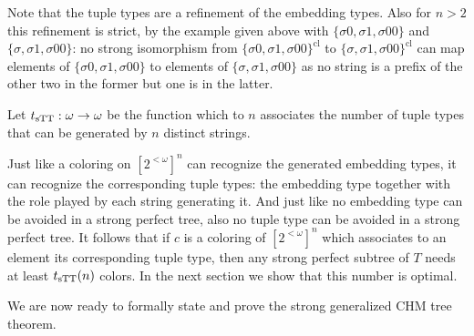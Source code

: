 Note that the tuple types are a refinement of the embedding types. Also for $n>2$ this refinement is strict, by the example given above with $\{\sigma0,\sigma1,\sigma00\}$ and $\{\sigma,\sigma1,\sigma00\}$: no strong isomorphism from $\{\sigma0,\sigma1,\sigma00\}^{\mathrm{cl}}$ to $\{\sigma,\sigma1,\sigma00\}^{\mathrm{cl}}$ can map elements of $\{\sigma0,\sigma1,\sigma00\}$ to elements of $\{\sigma,\sigma1,\sigma00\}$ as no string is a prefix of the other two in the former but one is in the latter.

\begin{definition}
Let $t_{\mathrm{sTT}}:\omega \rightarrow \omega$ be the function which to $n$ associates the number of tuple types that can be generated by $n$ distinct strings. 
\end{definition}

Just like a coloring on $[2^{<\omega}]^n$ can recognize the generated embedding types, it can recognize the corresponding tuple types: the embedding type together with the role played by each string generating it. And just like no embedding type can be avoided in a strong perfect tree, also no tuple type can be avoided in a strong perfect tree. It follows that if $c$ is a coloring of $[2^{<\omega}]^n$ which associates to an element its corresponding tuple type, then any strong perfect subtree of $T$ needs at least $t_{\mathrm{sTT}}(n)$ colors. In the next section we show that this number is optimal.



We are now ready to formally state and prove the strong generalized CHM tree theorem.

